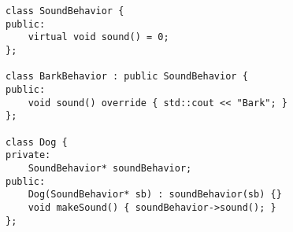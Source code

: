\documentclass{article}
\begin{document}
\begin{center}
    \begin{minipage}[c]{0.5\textwidth}
        \begin{verbatim}
class SoundBehavior {
public:
    virtual void sound() = 0;
};

class BarkBehavior : public SoundBehavior {
public:
    void sound() override { std::cout << "Bark"; }
};

class Dog {
private:
    SoundBehavior* soundBehavior;
public:
    Dog(SoundBehavior* sb) : soundBehavior(sb) {}
    void makeSound() { soundBehavior->sound(); }
};
        \end{verbatim}
    \end{minipage}
\end{center}
\end{document}
